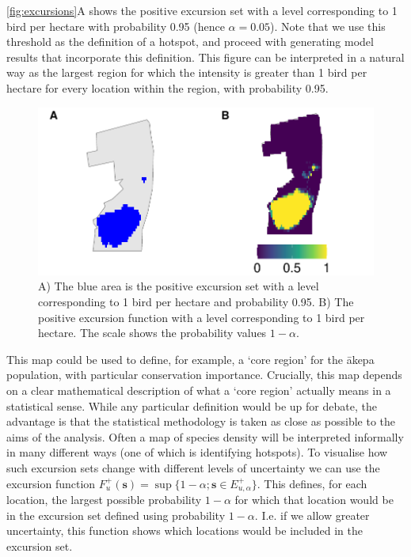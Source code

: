 \documentclass{statsoc}
\newcommand{\bs}{\mathbf{s}}
\newcommand{\akepa}{\textquotesingle\={a}kepa}  %
\begin{document}
\autoref{fig:excursions}A shows the positive excursion set with a level corresponding to 1 bird per hectare with probability 0.95 (hence $\alpha = 0.05$).  Note that we use this threshold as the definition of a hotspot, and proceed with generating model results that incorporate this definition.  This figure can be interpreted in a natural way as the largest region for which the intensity is greater than 1 bird per hectare for every location within the region, with probability 0.95. 
\begin{figure}[!htb]
	\includegraphics{figures/excursions.pdf}
	\caption{A) The blue area is the positive excursion set with a level corresponding to 1 bird per hectare and probability 0.95.  B) The positive excursion function with a level corresponding to 1 bird per hectare.  The scale shows the probability values $1-\alpha$.}
	\label{fig:excursions}
\end{figure} 
This map could be used to define, for example, a `core region' for the \akepa{} population, with particular conservation importance.  Crucially, this map depends on a clear mathematical description of what a `core region' actually means in a statistical sense.  While any particular definition would be up for debate, the advantage is that the statistical methodology is taken as close as possible to the aims of the analysis.  Often a map of species density will be interpreted informally in many different ways (one of which is identifying hotspots).  To visualise how such excursion sets change with different levels of uncertainty we can use the excursion function $F_u^{+}(\bs) = \sup \{1 - \alpha ; \bs \in E_{u,\alpha}^+ \}$.  This defines, for each location, the largest possible probability $1 -\alpha$ for which that location would be in the excursion set defined using probability $1 - \alpha$.  I.e.  if we allow greater uncertainty, this function shows which locations would be included in the excursion set.    
\end{document}
